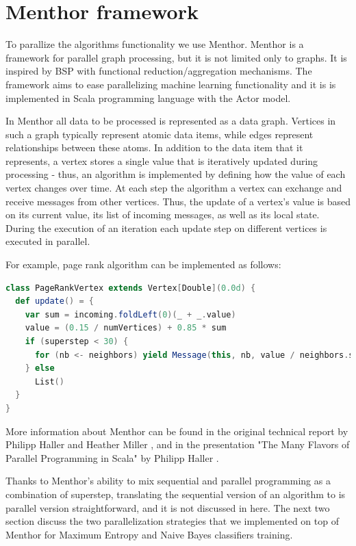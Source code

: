 \documentclass{report}
\begin{document}
\section{Menthor framework}

To parallize the algorithms functionality we use Menthor\cite{oai:infoscience.epfl.ch:165111}. Menthor is a framework for parallel graph processing, but it is not limited only to graphs. It is inspired by BSP with functional reduction/aggregation mechanisms. The  framework aims to ease parallelizing machine learning functionality and it is is implemented in Scala programming language with the Actor model.

In Menthor all data to be processed is represented as a data graph. Vertices in such a graph typically represent atomic data items, while edges represent relationships between these atoms. In addition to the data item that it represents, a vertex stores a
single value that is iteratively updated during processing - thus, an algorithm is implemented by defining how the value of each vertex changes over time. At each step the algorithm a vertex can exchange and receive messages from other vertices. Thus, the update of a vertex’s value is based on its current value, its list of incoming messages, as well as its local state. During the execution of an iteration each update step on different vertices is executed in parallel.

For example, page rank algorithm can be implemented as follows:

\begin{lstlisting}[language=scala, caption={Page rank algorithm}, label={listing:pagerank}]
class PageRankVertex extends Vertex[Double](0.0d) {
  def update() = {
    var sum = incoming.foldLeft(0)(_ + _.value)
    value = (0.15 / numVertices) + 0.85 * sum
    if (superstep < 30) {
      for (nb <- neighbors) yield Message(this, nb, value / neighbors.size)
    } else
      List()
  }
}
\end{lstlisting}

More information about Menthor can be found in the original technical report by Philipp Haller and Heather Miller \cite{oai:infoscience.epfl.ch:165111}, and in the presentation "The Many Flavors of Parallel Programming in Scala" by Philipp Haller \cite{scalaparallel}.

Thanks to Menthor's ability to mix sequential and parallel programming as a combination of superstep, translating the sequential version of an algorithm to is parallel version straightforward, and it is not discussed in here. The next two section discuss the two parallelization strategies that we implemented on top of Menthor for Maximum Entropy and Naive Bayes classifiers training.
\end{document}
